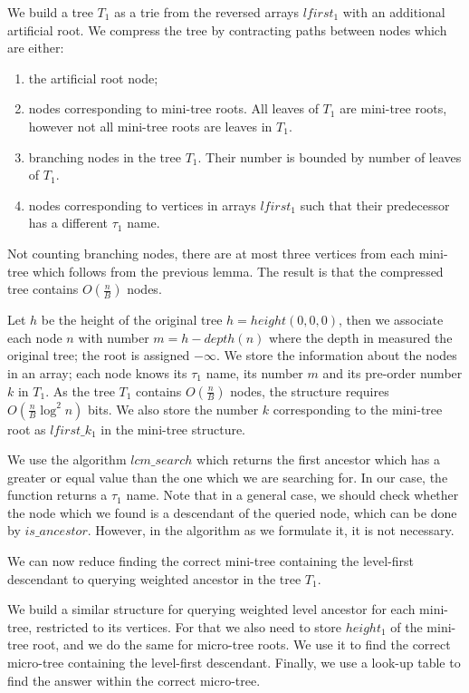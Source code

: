 We build a tree $T_1$ as a trie from the reversed arrays $lfirst_1$ with an additional artificial root.
We compress the tree by contracting paths between nodes which are either:
\begin{enumerate}
	\item the artificial root node;
	\item nodes corresponding to mini-tree roots.
	All leaves of $T_1$ are mini-tree roots, however not all mini-tree roots are leaves in $T_1$.
	\item branching nodes in the tree $T_1$.
	Their number is bounded by number of leaves of $T_1$.
	\item nodes corresponding to vertices in arrays $lfirst_1$ such that their predecessor has a different $\tau_1$ name.
\end{enumerate}
Not counting branching nodes, there are at most three vertices from each mini-tree which follows from the previous lemma.
The result is that the compressed tree contains $O(\frac{n}{B})$ nodes.

Let $h$ be the height of the original tree $h = height(0, 0, 0)$, then we associate each node $n$ with number $m = h - depth(n)$ where the depth in measured the original tree; the root is assigned $-\infty$.
We store the information about the nodes in an array; each node knows its $\tau_1$ name, its number $m$ and its pre-order number $k$ in $T_1$.
As the tree $T_1$ contains $O(\frac{n}{B})$ nodes, the structure requires $O(\frac{n}{B} \log^2 n)$ bits.
We also store the number $k$ corresponding to the mini-tree root as $lfirst\_k_1$ in the mini-tree structure.

We use the algorithm $lcm\_search$ which returns the first ancestor which has a greater or equal value than the one which we are searching for.
In our case, the function returns a $\tau_1$ name.
Note that in a general case, we should check whether the node which we found is a descendant of the queried node, which can be done by $is\_ancestor$.
However, in the algorithm as we formulate it, it is not necessary.

We can now reduce finding the correct mini-tree containing the level-first descendant to querying weighted ancestor in the tree $T_1$.

We build a similar structure for querying weighted level ancestor for each mini-tree, restricted to its vertices.
For that we also need to store $height_1$ of the mini-tree root, and we do the same for micro-tree roots.
We use it to find the correct micro-tree containing the level-first descendant.
Finally, we use a look-up table to find the answer within the correct micro-tree.

